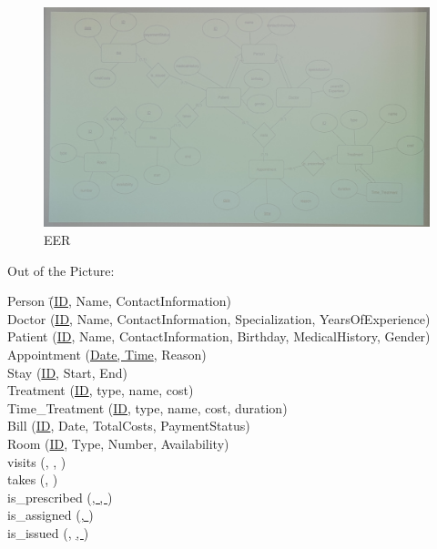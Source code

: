 \documentclass{article}
\begin{document}
\printfront
\task{}
\begin{figure}[hbtp]
  \centering
  \includegraphics[width=\textwidth]{EER Model.jpeg} 
  \caption{EER}
  \label{fig:meinjpeg}
\end{figure}

\task{}
Out of the Picture:
\begin{center}
\begin{tabbing}
    Person \qquad\qquad\qquad\= (\uline{ID}, Name, ContactInformation)\\
    Doctor \> (\uline{ID}, Name, ContactInformation, Specialization, YearsOfExperience)\\
    Patient \> (\uline{ID}, Name, ContactInformation, Birthday, MedicalHistory, Gender)\\
    Appointment \> (\uline{Date, Time}, Reason)\\
    Stay \> (\uline{ID}, Start, End)\\
    Treatment \> (\uline{ID}, type, name, cost)\\
    Time\_Treatment \> (\uline{ID}, type, name, cost, duration)\\
    Bill \> (\uline{ID}, Date, TotalCosts, PaymentStatus)\\
    Room \> (\uline{ID}, Type, Number, Availability)\\[1em]
    visits \> (, , )\\
    takes \> (, )\\
    is\_prescribed \> (\uline{, , })\\
    is\_assigned \> (\uline{, })\\
    is\_issued \> (, \uline{, })
\end{tabbing}
\end{center}
\end{document}
